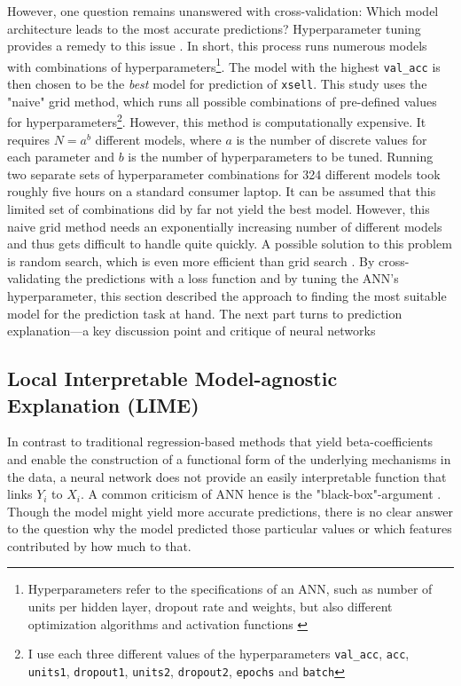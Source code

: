 \documentclass[12pt,a4paper]{article}
\let\code=\texttt
\begin{document}
However, one question remains unanswered with cross-validation: Which model architecture leads to the most accurate predictions?
Hyperparameter tuning provides a remedy to this issue \citep{bergstraRandomSearchHyperparameter2012}.
In short, this process runs numerous models with combinations of hyperparameters\footnote{Hyperparameters refer to the specifications of an ANN,
such as number of units per hidden layer, dropout rate and weights, but also different optimization algorithms and activation functions \citep{bengioGradientbasedOptimizationHyperparameters2000}}. 
The model with the highest \code{val\_acc} is then chosen to be the \textit{best} model for prediction of \code{xsell}.
This study uses the "naive" grid method, which runs all possible combinations of pre-defined values for hyperparameters\footnote{I use each three different values of the hyperparameters \code{val\_acc}, \code{acc}, \code{units1}, \code{dropout1}, \code{units2}, \code{dropout2}, \code{epochs} and \code{batch}}.
However, this method is computationally expensive.
It requires $N=a^b$ different models, where $a$ is the number of discrete values for each parameter and $b$ is the 
number of hyperparameters to be tuned.
Running two separate sets of hyperparameter combinations for 324 different models took roughly five hours on a standard consumer laptop.
It can be assumed that this limited set of combinations did by far not yield the best model.
However, this naive grid method needs an exponentially increasing number of different models and thus gets difficult to handle quite quickly.
A possible solution to this problem is random search, which is even more efficient than grid search \citep{bergstraRandomSearchHyperparameter2012}.
By cross-validating the predictions with a loss function and by tuning the ANN's hyperparameter, 
this section described the approach to finding the most suitable model for the prediction task at hand.
The next part turns to prediction explanation---a key discussion point and critique of neural networks

\subsection{Local Interpretable Model-agnostic Explanation (LIME)}
In contrast to traditional regression-based methods that yield beta-coefficients and enable the construction of a functional form of 
the underlying mechanisms in the data, a neural network does not provide an easily interpretable function that links $Y_i$ to $X_i$.
A common criticism of ANN hence is the "black-box"-argument \citep{benitezAreArtificialNeural1997, dayhoffArtificialNeuralNetworks2001}.
Though the model might yield more accurate predictions, there is no clear answer to the question why the model predicted those particular values
or which features contributed by how much to that.
\end{document}
